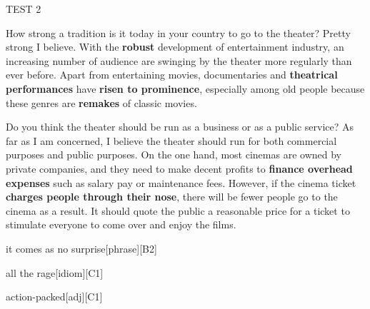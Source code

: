\begin{glossarymc}[Cambridge 12]
\begin{test}{TEST 2}
    \begin{qa}{How strong a tradition is it today in your country to go to the theater?}
    Pretty strong I believe. With the \textbf{robust} development of entertainment industry, an increasing number of audience are swinging by the theater more regularly than ever before. Apart from entertaining movies, documentaries and \textbf{theatrical performances} have \textbf{risen to prominence}, especially among old people because these genres are \textbf{remakes} of classic movies.
    \end{qa}

    \begin{qa}{Do you think the theater should be run as a business or as a public service?}
    As far as I am concerned, I believe the theater should run for both commercial purposes and public purposes. On the one hand, most cinemas are owned by private companies, and they need to make decent profits to \textbf{finance overhead expenses} such as salary pay or maintenance fees. However, if the cinema ticket \textbf{charges people through their nose}, there will be fewer people go to the cinema as a result. It should quote the public a reasonable price for a ticket to stimulate everyone to come over and enjoy the films.
    \end{qa}

        \begin{VocabExplain}[Part 3]
            \begin{ExplainCard}{it comes as no surprise}[phrase][B2]
            \end{ExplainCard}

            \begin{ExplainCard}{all the rage}[idiom][C1]
            \end{ExplainCard}

            \begin{ExplainCard}{action-packed}[adj][C1]
            \end{ExplainCard}


\end{VocabExplain}
\end{test}
\end{glossarymc}
